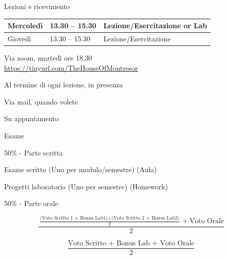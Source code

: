 \begin{frame}{Lezioni e ricevimento}
	
\vspace{-9pt}
\begin{myboxtitle}[Lezioni]
\bigskip
\begin{tabular}{|l|l|l|}
\hline
Mercoledì & 13.30 -- 15.30 & Lezione/Esercitazione \textbf{or} Lab \\\hline
Giovedì & 13.30 -- 15.30 & Lezione/Esercitazione \\\hline
\end{tabular}
\end{myboxtitle}

\begin{myboxtitle}[Ricevimento]
\BI
\item Via zoom, martedì ore 18.30\\
\url{https://tinyurl.com/TheHouseOfMontresor}
\item Al termine di ogni lezione, in presenza
\item Via mail, quando volete
\item Su appuntamento	
\EI
\end{myboxtitle}
	
\end{frame}

\begin{frame}{Esame}

\vspace{-9pt}
\begin{myboxtitle}
\BIL
\item \alert{50\% - Parte scritta}
\BI
\item Esame scritto (Uno per modulo/semestre) (Aula)
\item Progetti laboratorio (Uno per semestre) (Homework) 
\EI
\item \alert{50\% - Parte orale}
\EIL
\end{myboxtitle}

\begin{myboxtitle}
\[
\frac{\frac{\textrm{(Voto Scritto 1 + Bonus Lab1)} + \textrm{(Voto Scritto 2 + Bonus Lab2)}}{2} + \textrm{Voto Orale}}{2}
\]
\end{myboxtitle}

\begin{myboxtitle}
\[
\frac{\textrm{Voto Scritto + Bonus Lab + Voto Orale}}{2}
\]
\end{myboxtitle}

\end{frame}

